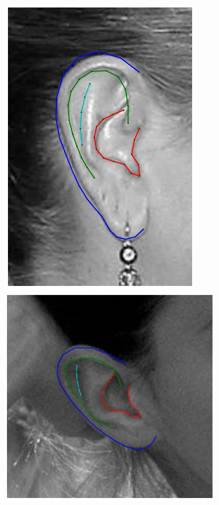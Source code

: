 \begin{figure}
    \hfill
    \includegraphics[height=\flowh]{resources/Ear_Deformable_Model/fittings/final_0008}
    \hfill
    \includegraphics[height=\flowh]{resources/Ear_Deformable_Model/fittings/final_0028}

\end{figure}
